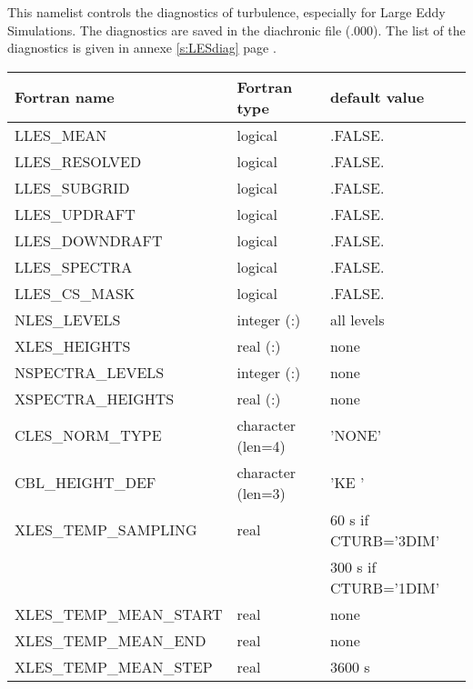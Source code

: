 This namelist controls the diagnostics of turbulence, especially
for Large Eddy Simulations. The diagnostics are saved in the
diachronic file (.000). The list of the diagnostics is given in annexe \ref{s:LESdiag} page  \pageref{s:LESdiag}.

\begin{center}
\begin{tabular} {|l|l|l|}
\hline
Fortran name & Fortran type & default value \\
\hline
LLES\_MEAN                    &  logical          & .FALSE.  \\
LLES\_RESOLVED                &  logical          & .FALSE.  \\
LLES\_SUBGRID                 &  logical          & .FALSE.  \\
LLES\_UPDRAFT                 &  logical          & .FALSE.  \\
LLES\_DOWNDRAFT               &  logical          & .FALSE.  \\
LLES\_SPECTRA                 &  logical          & .FALSE.  \\
LLES\_CS\_MASK                &  logical          & .FALSE.  \\
NLES\_LEVELS                  & integer (:)       & all levels\\
XLES\_HEIGHTS                 & real (:)          & none \\
NSPECTRA\_LEVELS              & integer (:)   & none \\
XSPECTRA\_HEIGHTS             & real (:)   & none \\
CLES\_NORM\_TYPE              & character (len=4) & 'NONE' \\
CBL\_HEIGHT\_DEF              & character (len=3) & 'KE ' \\
XLES\_TEMP\_SAMPLING          & real              & 60 s if CTURB='3DIM' \\
                              &                   & 300 s if CTURB='1DIM' \\
XLES\_TEMP\_MEAN\_START       & real              & none \\
XLES\_TEMP\_MEAN\_END         & real              & none \\
XLES\_TEMP\_MEAN\_STEP        & real              & 3600 s \\

\end{tabular}
\end{center}
